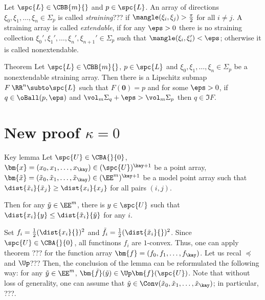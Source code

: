 {Let $\spc{L}\in\CBB{m}{}$ and $p\in \spc{L}$.
An array of directions $\xi_0,\xi_1,\dots,\xi_n\in \Sigma_p$ is called \emph{straining}??? if $\mangle(\xi_i,\xi_j)>\tfrac\pi2$ for all $i\not=j$.
A straining array is called \emph{extendable}, if for any $\eps>0$ there is no straining collection $\xi_0',\xi_1',\dots,\xi_n',\xi_{n+1}'\in \Sigma_p$ such that
$\mangle(\xi_i,\xi_i')<\eps$;
otherwise it is called nonextendable.

\begin{thm}{Theorem}
Let $\spc{L}\in\CBB{m}{}$, $p\in \spc{L}$ and $\xi_0,\xi_1,\dots,\xi_n\in \Sigma_p$ be a nonextendable straining array.
Then there is a Lipschitz submap $F\:\RR^n\subto \spc{L}$ such that $F(\bm{0})=p$ and
for some $\eps>0$, if $q\in\oBall(p,\eps)$ and $\vol_m\Sigma_q+\eps>\vol_m\Sigma_p$  then $q\in\Im F$.
\end{thm}






















\section{New proof $\kappa=0$}

\begin{thm}{Key lemma}
Let $\spc{U}\in\CBA{}{0}$, 
$\bm{x}=(x_0,x_1,\dots,x_\kay)\in (\spc{U})^{\kay+1}$ be a point array, $\bm{\tilde x}=(\tilde x_0,\tilde x_1,\dots,\tilde x_\kay)\in (\EE^m)^{\kay+1}$ be a model point array
such that $\dist{\tilde x_i}{\tilde x_j}\ge\dist{x_i}{x_j}$ for all pairs $(i,j)$.

Then for any $\tilde y\in \EE^m$, there is $y\in\spc{U}$ such that $\dist{x_i}{y}\le\dist{\tilde x_i}{\tilde y}$ for any $i$.
\end{thm}

Set $f_i=\tfrac{1}{2}(\dist{x_i}{})^2$ and $\tilde f_i=\tfrac{1}{2}(\dist{\tilde x_i}{})^2$.
Since $\spc{U}\in\CBA{}{0}$,
all functinons $f_i$ are $1$-convex.
Thus, one can apply theorem ??? for the function array $\bm{f}=(f_0,f_1,\dots,f_\kay)$.
Let us recal $\preccurlyeq$ and $\Up$???
Then, the conclusion of the lemma can be reformulated the following way: 
for any $\tilde y\in \EE^m$, $\bm{\tilde f}(\tilde y)\in\Up\bm{f}(\spc{U})$.
Note that without loss of generality, one can assume that $\tilde y\in\Conv(\tilde x_0,\tilde x_1,\dots,\tilde x_\kay)$;
in particular, ???.

}
